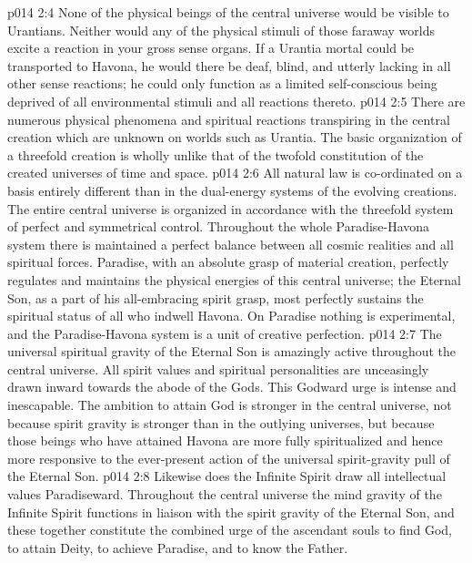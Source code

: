 \vs p014 2:4 None of the physical beings of the central universe would be visible to Urantians. Neither would any of the physical stimuli of those faraway worlds excite a reaction in your gross sense organs. If a Urantia mortal could be transported to Havona, he would there be deaf, blind, and utterly lacking in all other sense reactions; he could only function as a limited self\hyp{}conscious being deprived of all environmental stimuli and all reactions thereto.
\pc \vs p014 2:5 There are numerous physical phenomena and spiritual reactions transpiring in the central creation which are unknown on worlds such as Urantia. The basic organization of a threefold creation is wholly unlike that of the twofold constitution of the created universes of time and space.
\vs p014 2:6 All natural law is co\hyp{}ordinated on a basis entirely different than in the dual\hyp{}energy systems of the evolving creations. The entire central universe is organized in accordance with the threefold system of perfect and symmetrical control. Throughout the whole Paradise\hyp{}Havona system there is maintained a perfect balance between all cosmic realities and all spiritual forces. Paradise, with an absolute grasp of material creation, perfectly regulates and maintains the physical energies of this central universe; the Eternal Son, as a part of his all\hyp{}embracing spirit grasp, most perfectly sustains the spiritual status of all who indwell Havona. On Paradise nothing is experimental, and the Paradise\hyp{}Havona system is a unit of creative perfection.
\vs p014 2:7 The universal spiritual gravity of the Eternal Son is amazingly active throughout the central universe. All spirit values and spiritual personalities are unceasingly drawn inward towards the abode of the Gods. This Godward urge is intense and inescapable. The ambition to attain God is stronger in the central universe, not because spirit gravity is stronger than in the outlying universes, but because those beings who have attained Havona are more fully spiritualized and hence more responsive to the ever\hyp{}present action of the universal spirit\hyp{}gravity pull of the Eternal Son.
\vs p014 2:8 Likewise does the Infinite Spirit draw all intellectual values Paradiseward. Throughout the central universe the mind gravity of the Infinite Spirit functions in liaison with the spirit gravity of the Eternal Son, and these together constitute the combined urge of the ascendant souls to find God, to attain Deity, to achieve Paradise, and to know the Father.
